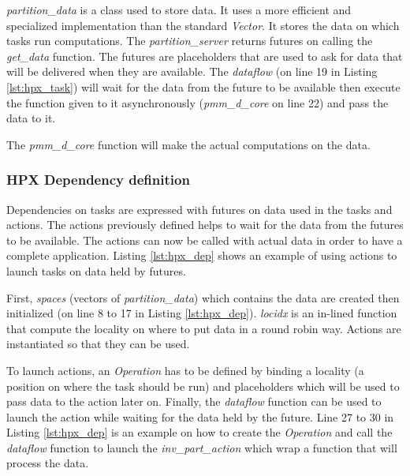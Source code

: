 \textit{partition\_data} is a class used to store data.
It uses a more efficient and specialized implementation than the standard \textit{Vector}.
It stores the data on which tasks run computations.
The \textit{partition\_server} returns futures on calling the \textit{get\_data} function.
The futures are placeholders that are used to ask for data that will be delivered when they are available.
The \textit{dataflow} (on line 19 in Listing \ref{lst:hpx_task}) will wait for the data from the future to be available then execute the function given to it asynchronously (\textit{pmm\_d\_core} on line 22) and pass the data to it.

The \textit{pmm\_d\_core} function will make the actual computations on the data.

\subsubsection{HPX Dependency definition}
Dependencies on tasks are expressed with futures on data used in the tasks and actions.
The actions previously defined helps to wait for the data from the futures to be available.
The actions can now be called with actual data in order to have a complete application.
Listing \ref{lst:hpx_dep} shows an example of using actions to launch tasks on data held by futures.

First, \textit{spaces} (vectors of \textit{partition\_data}) which contains the data are created then initialized (on line 8 to 17 in Listing \ref{lst:hpx_dep}).
\textit{locidx} is an in-lined function that compute the locality on where to put data in a round robin way.
Actions are instantiated so that they can be used.

To launch actions, an \textit{Operation} has to be defined by binding a locality (a position on where the task should be run) and placeholders which will be used to pass data to the action later on.
Finally, the \textit{dataflow} function can be used to launch the action while waiting for the data held by the future.
Line 27 to 30 in Listing \ref{lst:hpx_dep} is an example on how to create the \textit{Operation} and call the \textit{dataflow} function to launch the \textit{inv\_part\_action} which wrap a function that will process the data.



